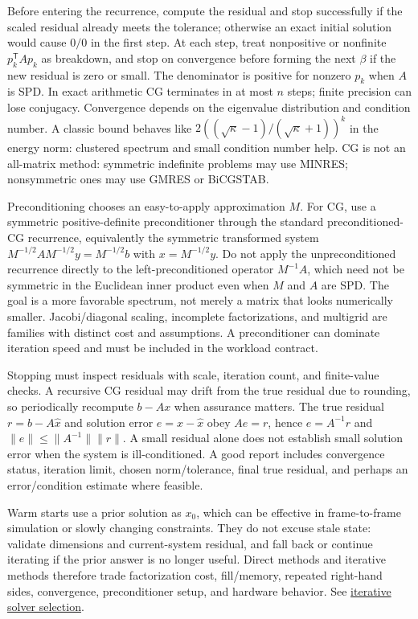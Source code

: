 Before entering the recurrence, compute the residual and stop successfully if the scaled residual already meets the tolerance; otherwise an exact initial solution would cause \(0/0\) in the first step. At each step, treat nonpositive or nonfinite \(p_k^\mathsf TAp_k\) as breakdown, and stop on convergence before forming the next \(\beta\) if the new residual is zero or small. The denominator is positive for nonzero \(p_k\) when \(A\) is SPD. In exact arithmetic CG terminates in at most \(n\) steps; finite precision can lose conjugacy. Convergence depends on the eigenvalue distribution and condition number. A classic bound behaves like \(2((\sqrt\kappa-1)/(\sqrt\kappa+1))^k\) in the energy norm: clustered spectrum and small condition number help. CG is not an all-matrix method: symmetric indefinite problems may use MINRES; nonsymmetric ones may use GMRES or BiCGSTAB.

Preconditioning chooses an easy-to-apply approximation \(M\). For CG, use a symmetric positive-definite preconditioner through the standard preconditioned-CG recurrence, equivalently the symmetric transformed system \(M^{-1/2}AM^{-1/2}y=M^{-1/2}b\) with \(x=M^{-1/2}y\). Do not apply the unpreconditioned recurrence directly to the left-preconditioned operator \(M^{-1}A\), which need not be symmetric in the Euclidean inner product even when \(M\) and \(A\) are SPD. The goal is a more favorable spectrum, not merely a matrix that looks numerically smaller. Jacobi/diagonal scaling, incomplete factorizations, and multigrid are families with distinct cost and assumptions. A preconditioner can dominate iteration speed and must be included in the workload contract.

Stopping must inspect residuals with scale, iteration count, and finite-value checks. A recursive CG residual may drift from the true residual due to rounding, so periodically recompute \(b-Ax\) when assurance matters. The true residual \(r=b-A\hat x\) and solution error \(e=x-\hat x\) obey \(Ae=r\), hence \(e=A^{-1}r\) and \(\|e\|\le\|A^{-1}\|\|r\|\). A small residual alone does not establish small solution error when the system is ill-conditioned. A good report includes convergence status, iteration limit, chosen norm/tolerance, final true residual, and perhaps an error/condition estimate where feasible.

Warm starts use a prior solution as \(x_0\), which can be effective in frame-to-frame simulation or slowly changing constraints. They do not excuse stale state: validate dimensions and current-system residual, and fall back or continue iterating if the prior answer is no longer useful. Direct methods and iterative methods therefore trade factorization cost, fill/memory, repeated right-hand sides, convergence, preconditioner setup, and hardware behavior. See \hyperref[02-foundations-ii-ch038-sparse-storage-changes-the-cost-model]{iterative solver selection}.

